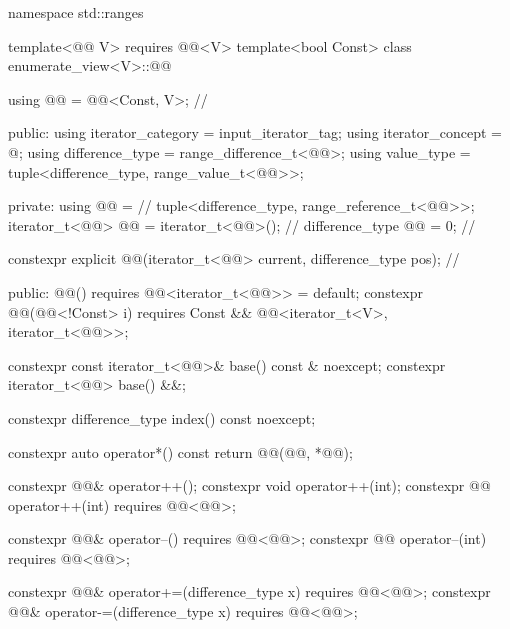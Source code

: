 %
\begin{codeblock}
namespace std::ranges {
  template<@@ V>
    requires @@<V>
  template<bool Const>
  class enumerate_view<V>::@@ {
    using @@ = @@<Const, V>;                         // \expos

  public:
    using iterator_category = input_iterator_tag;
    using iterator_concept = @\seebelow@;
    using difference_type = range_difference_t<@@>;
    using value_type = tuple<difference_type, range_value_t<@@>>;

  private:
    using @@ =                                      // \expos
      tuple<difference_type, range_reference_t<@@>>;
    iterator_t<@@> @@ = iterator_t<@@>();             // \expos
    difference_type @@ = 0;                                   // \expos

    constexpr explicit
      @@(iterator_t<@@> current, difference_type pos);  // \expos

  public:
    @@() requires @@<iterator_t<@@>> = default;
    constexpr @@(@@<!Const> i)
      requires Const && @@<iterator_t<V>, iterator_t<@@>>;

    constexpr const iterator_t<@@>& base() const & noexcept;
    constexpr iterator_t<@@> base() &&;

    constexpr difference_type index() const noexcept;

    constexpr auto operator*() const {
      return @@(@@, *@@);
    }

    constexpr @@& operator++();
    constexpr void operator++(int);
    constexpr @@ operator++(int) requires @@<@@>;

    constexpr @@& operator--() requires @@<@@>;
    constexpr @@ operator--(int) requires @@<@@>;

    constexpr @@& operator+=(difference_type x)
      requires @@<@@>;
    constexpr @@& operator-=(difference_type x)
      requires @@<@@>;

}}
\end{codeblock}
